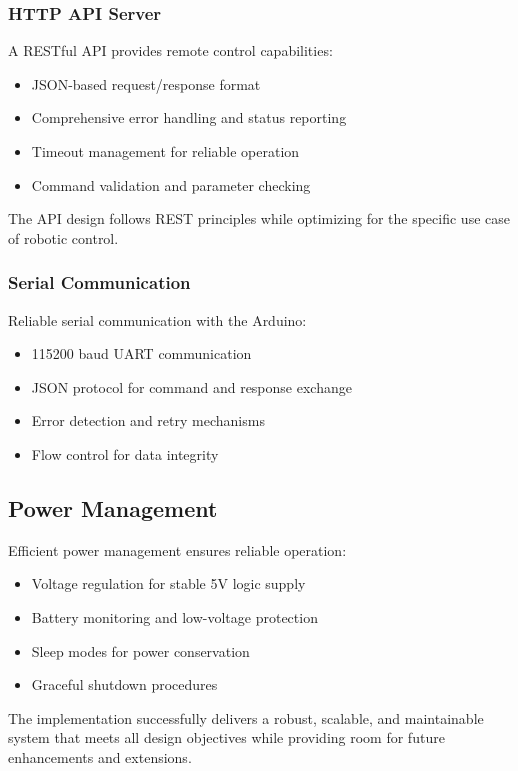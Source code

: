 \subsubsection{HTTP API Server}

A RESTful API provides remote control capabilities:

\begin{itemize}
    \item JSON-based request/response format
    \item Comprehensive error handling and status reporting
    \item Timeout management for reliable operation
    \item Command validation and parameter checking
\end{itemize}

The API design follows REST principles while optimizing for the specific use case of robotic control.

\subsubsection{Serial Communication}

Reliable serial communication with the Arduino:

\begin{itemize}
    \item 115200 baud UART communication
    \item JSON protocol for command and response exchange
    \item Error detection and retry mechanisms
    \item Flow control for data integrity
\end{itemize}

\subsection{Power Management}

Efficient power management ensures reliable operation:

\begin{itemize}
    \item Voltage regulation for stable 5V logic supply
    \item Battery monitoring and low-voltage protection
    \item Sleep modes for power conservation
    \item Graceful shutdown procedures
\end{itemize}
The implementation successfully delivers a robust, scalable, and maintainable system that meets all design objectives while providing room for future enhancements and extensions.
